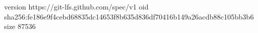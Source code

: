 version https://git-lfs.github.com/spec/v1
oid sha256:fe186e9f4cebd68835dc14653f8b635d836df70416b149a26acdb88c105bb3b6
size 87536
